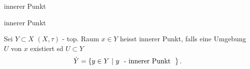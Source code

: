 \documentclass[class=article, crop=false]{standalone}
\begin{document}
\begin{zettel}{innerer Punkt}
\begin{flashcard}[hygbpw1n]{innerer Punkt}
	\begin{definition}
		Sei $Y \subset X$ $(X, \tau )$ - top. Raum $x \in  Y$ heisst innerer Punkt, falls eine Umgebung $U$ von $x$ existiert sd $U \subset Y$
		\[
			\dot{Y} = \set{y \in  Y}{y \tx{ - innerer Punkt } }
		.\]
	\end{definition}
\end{flashcard}
\end{zettel}
\end{document}
